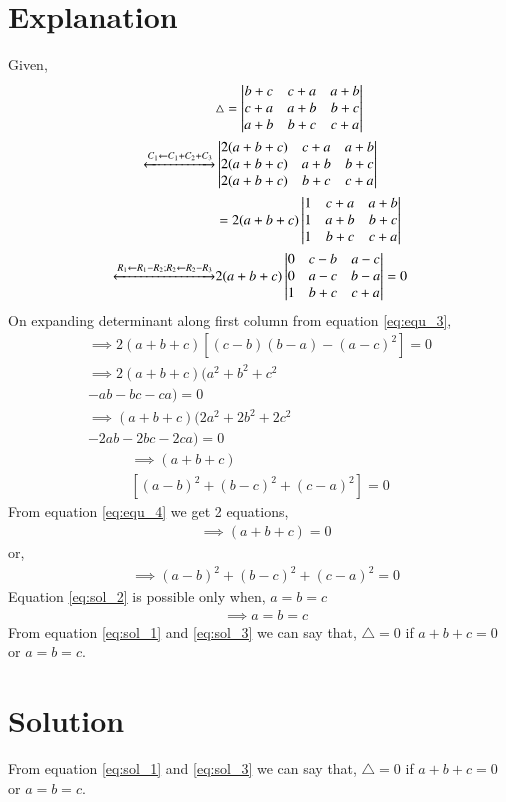 \documentclass[journal,12pt,twocolumn]{IEEEtran}
\begin{document}
\section{Explanation}
Given,\\
\begin{align}
&\triangle = \begin{vmatrix}b+c & c+a & a+b\\c+a & a+b & b+c\\a+b&b+c & c+a\end{vmatrix} \label{eq:ques}\\
\xleftrightarrow[]{C_1\leftarrow C_1+C_2+C_3}
&\begin{vmatrix}2(a+b+c) & c+a & a+b\\2(a+b+c) & a+b & b+c\\2(a+b+c)&b+c & c+a\end{vmatrix} \label{eq:eq_1}\\
&=2(a+b+c)\begin{vmatrix}1 & c+a & a+b\\1 & a+b & b+c\\1&b+c & c+a\end{vmatrix} \label{eq:eq_2}\\
\xleftrightarrow[]{R_1\leftarrow R_1-R_2; R_2 \leftarrow R_2-R_3}
&2(a+b+c)\begin{vmatrix}0 & c-b & a-c\\0 & a-c & b-a\\1&b+c & c+a\end{vmatrix} =0 \label{eq:equ_3}
\end{align}
On expanding determinant along first column from equation \eqref{eq:equ_3},
\begin{multline*}
\implies 2(a+b+c)[(c-b)(b-a)-(a-c)^{2}]=0
\\
\implies 2(a+b+c)(a^{2}+b^{2}+c^{2}\\
-ab-bc-ca)=0
\\
\implies (a+b+c)(2a^{2}+2b^{2}+2c^{2}\\
-2ab-2bc-2ca)=0
\end{multline*}
\begin{multline}
\implies (a+b+c)\\
[(a-b)^{2}+(b-c)^{2}+(c-a)^{2}] = 0 \label{eq:equ_4}
\end{multline}
From equation \eqref{eq:equ_4} we get 2 equations,
\begin{align}
&\implies \boxed{(a+b+c) = 0} \label{eq:sol_1}
\end{align}
or,
\begin{align}
&\implies (a-b)^{2}+(b-c)^{2}+(c-a)^{2} = 0 \label{eq:sol_2}
\end{align}
Equation \eqref{eq:sol_2} is possible only when, $a=b=c$
\begin{align}
&\implies \boxed{a=b=c} \label{eq:sol_3}
\end{align}
From equation \eqref{eq:sol_1} and \eqref{eq:sol_3} we can say that,
$\triangle=0$ if $a+b+c=0$ or $a=b=c$.
\section{Solution}

From equation \eqref{eq:sol_1} and \eqref{eq:sol_3} we can say that,
$\triangle=0$ if $a+b+c=0$ or $a=b=c$.

\\
\end{document}
